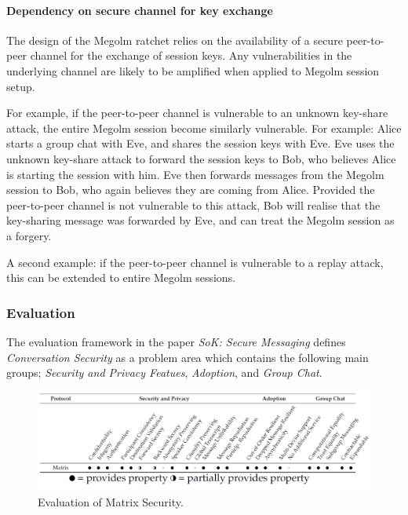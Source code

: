 \paragraph{Dependency on secure channel for key exchange}
The design of the Megolm ratchet relies on the availability of a secure peer-to-peer channel for the exchange of session keys. Any vulnerabilities in the underlying channel are likely to be amplified when applied to Megolm session setup.

For example, if the peer-to-peer channel is vulnerable to an unknown key-share attack, the entire Megolm session become similarly vulnerable. For example: Alice starts a group chat with Eve, and shares the session keys with Eve. Eve uses the unknown key-share attack to forward the session keys to Bob, who believes Alice is starting the session with him. Eve then forwards messages from the Megolm session to Bob, who again believes they are coming from Alice. Provided the peer-to-peer channel is not vulnerable to this attack, Bob will realise that the key-sharing message was forwarded by Eve, and can treat the Megolm session as a forgery.

A second example: if the peer-to-peer channel is vulnerable to a replay attack, this can be extended to entire Megolm sessions.






\subsubsection{Evaluation}
The evaluation framework in the paper \emph{SoK: Secure Messaging} defines \emph{Conversation Security} as a problem area which contains the following main groups; \emph{Security and Privacy Featues}, \emph{Adoption}, and \emph{Group Chat}.


\begin{figure}[H]
	\centering
	\includegraphics[width=12cm]{figures/framework.png}
	\caption{Evaluation of Matrix Security.}
	\label{fig:framework}
\end{figure}



